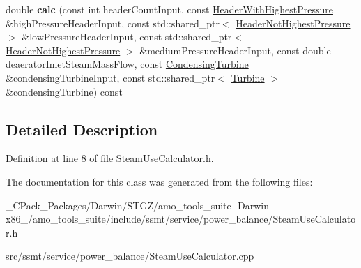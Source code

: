 \begin{DoxyCompactItemize}
double {\bfseries calc} (const int header\+Count\+Input, const \hyperlink{class_header_with_highest_pressure}{Header\+With\+Highest\+Pressure} \&high\+Pressure\+Header\+Input, const std\+::shared\+\_\+ptr$<$ \hyperlink{class_header_not_highest_pressure}{Header\+Not\+Highest\+Pressure} $>$ \&low\+Pressure\+Header\+Input, const std\+::shared\+\_\+ptr$<$ \hyperlink{class_header_not_highest_pressure}{Header\+Not\+Highest\+Pressure} $>$ \&medium\+Pressure\+Header\+Input, const double deaerator\+Inlet\+Steam\+Mass\+Flow, const \hyperlink{class_condensing_turbine}{Condensing\+Turbine} \&condensing\+Turbine\+Input, const std\+::shared\+\_\+ptr$<$ \hyperlink{class_turbine}{Turbine} $>$ \&condensing\+Turbine) const
\end{DoxyCompactItemize}


\subsection{Detailed Description}


Definition at line 8 of file Steam\+Use\+Calculator.\+h.



The documentation for this class was generated from the following files\+:\begin{DoxyCompactItemize}
\item 
\+\_\+\+C\+Pack\+\_\+\+Packages/\+Darwin/\+S\+T\+G\+Z/amo\+\_\+tools\+\_\+suite-\/-\/\+Darwin-\/x86\+\_/amo\+\_\+tools\+\_\+suite/include/ssmt/service/power\+\_\+balance/Steam\+Use\+Calculator.\+h\item 
src/ssmt/service/power\+\_\+balance/Steam\+Use\+Calculator.\+cpp\end{DoxyCompactItemize}
